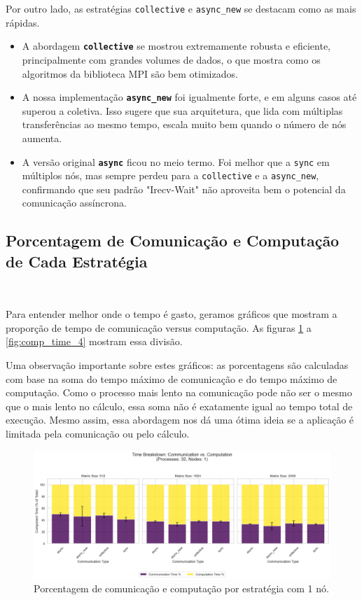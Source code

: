 \documentclass{article}
\begin{document}
Por outro lado, as estratégias \texttt{collective} e \texttt{async\_new} se destacam como as mais rápidas.
\begin{itemize}
    \item A abordagem \textbf{\texttt{collective}} se mostrou extremamente robusta e eficiente, principalmente com grandes volumes de dados, o que mostra como os algoritmos da biblioteca MPI são bem otimizados.
    \item A nossa implementação \textbf{\texttt{async\_new}} foi igualmente forte, e em alguns casos até superou a coletiva. Isso sugere que sua arquitetura, que lida com múltiplas transferências ao mesmo tempo, escala muito bem quando o número de nós aumenta.
    \item A versão original \textbf{\texttt{async}} ficou no meio termo. Foi melhor que a \texttt{sync} em múltiplos nós, mas sempre perdeu para a \texttt{collective} e a \texttt{async\_new}, confirmando que seu padrão "Irecv-Wait" não aproveita bem o potencial da comunicação assíncrona.
\end{itemize}

\subsection{Porcentagem de Comunicação e Computação de Cada Estratégia}
\

Para entender melhor onde o tempo é gasto, geramos gráficos que mostram a proporção de tempo de comunicação versus computação. As figuras \ref{fig:comp_time_1} a \ref{fig:comp_time_4} mostram essa divisão.

Uma observação importante sobre estes gráficos: as porcentagens são calculadas com base na soma do tempo máximo de comunicação e do tempo máximo de computação. Como o processo mais lento na comunicação pode não ser o mesmo que o mais lento no cálculo, essa soma não é exatamente igual ao tempo total de execução. Mesmo assim, essa abordagem nos dá uma ótima ideia se a aplicação é limitada pela comunicação ou pelo cálculo.

\begin{figure}[H]
    \centering
    \includegraphics[width=1\linewidth]{images/comp_time_1node.png}
    \caption{Porcentagem de comunicação e computação por estratégia com 1 nó.}
    \label{fig:comp_time_1}
\end{figure}
\end{document}

